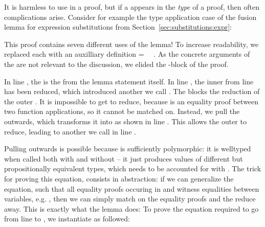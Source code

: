 \documentclass[acmsmall,anonymous,review,screen]{acmart}
\newenvironment{AgdaBlock}{%
  \vspace{\AgdaEmptySkip}%
  \AgdaNoSpaceAroundCode{}%
}{%
  \AgdaSpaceAroundCode{}
}
\begin{document}
It is harmless to use {\Asubst} in a proof, but if a {\Asubst} appears
in the \emph{type} of a proof, then often complications arise.
Consider for example the type application case {} of the fusion lemma for
expression substitutions from Section~\ref{sec:substitutions:expr}:

\begin{AgdaBlock}
  \SubstExamplesFusionESubESub
  \SubstExamplesFusionESubESubBody
\end{AgdaBlock}

This proof contains seven different uses of the {\Asubst} lemma!
To increase readability, we replaced each {\Asubst} 
with an auxilliary definition { = \Asubst~~}.
As the concrete arguments of the {} are not relevant to the
discussion, we elided the -block of the proof.

In line , the {} is the  from the lemma statement itself.
In line , the inner {\AEsub} from line  has been reduced, which
introduced another {\Asubst} we call {}.
The {} blocks the reduction of the outer {\AEsub}.
It is impossible to get {} to reduce, because {} is
an equality proof between two function applications, so it cannot be
matched on.
Instead, we pull the {} outwards, which transforms it into
{} as shown in line . This allows the outer {\AEsub}
to reduce, leading to another {\Asubst} we call {} in line .

Pulling {} outwards is possible because {\AEsub} is sufficiently polymorphic:
it is welltyped when called both with and without {} -- it just produces values
of different but propositionally equivalent types, which needs to be accounted for with {}.
The trick for proving this equation, consists in abstraction:
if we can generalize the equation, such that all equality proofs occuring in {}
and  {} witness equalities between variables, e.g. , then
we can simply match on the equality proofs and the {} reduce away.
This is exactly what the {} lemma does:
\SubstExamplesDistSubst
To prove the equation required to go from line  to , we
instantiate {} as followed:
\SubstExamplesFusionESubESubBodyProofA

\end{document}
